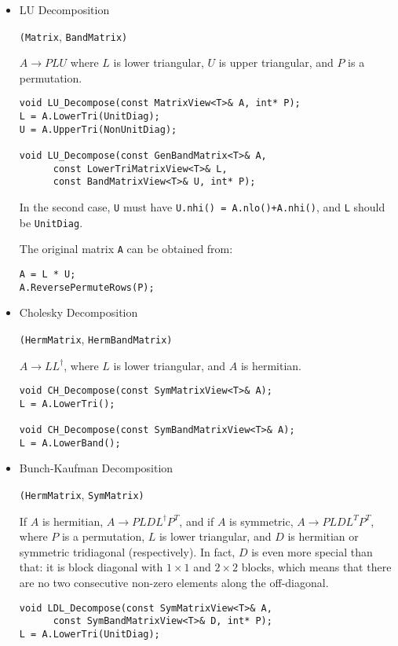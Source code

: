\documentclass[twoside,letterpaper,11pt]{article}
\renewcommand{\tt}[1]{{\texttt {#1}}}
\begin{document}
\begin{itemize}

\item LU Decomposition 

\tt{(Matrix}, \tt{BandMatrix)}

$A \rightarrow P L U$ where $L$ is lower triangular, 
$U$ is upper triangular, and $P$ is a permutation.

\begin{verbatim}
void LU_Decompose(const MatrixView<T>& A, int* P);
L = A.LowerTri(UnitDiag);
U = A.UpperTri(NonUnitDiag);

void LU_Decompose(const GenBandMatrix<T>& A, 
      const LowerTriMatrixView<T>& L, 
      const BandMatrixView<T>& U, int* P);
\end{verbatim}
In the second case, \tt{U} must have \tt{U.nhi() = A.nlo()+A.nhi()},
and \tt{L} should be \tt{UnitDiag}.

The original matrix \tt{A} can be obtained from:
\begin{verbatim}
A = L * U;
A.ReversePermuteRows(P);
\end{verbatim}

\item Cholesky Decomposition 

\tt{(HermMatrix}, \tt{HermBandMatrix)}

$A \rightarrow L L^\dagger$, where $L$ is lower triangular,
and $A$ is hermitian.

\begin{verbatim}
void CH_Decompose(const SymMatrixView<T>& A);
L = A.LowerTri();

void CH_Decompose(const SymBandMatrixView<T>& A);
L = A.LowerBand();
\end{verbatim}

\item Bunch-Kaufman Decomposition 

\tt{(HermMatrix}, \tt{SymMatrix)}

If $A$ is hermitian, $A \rightarrow P L D L^\dagger P^T$,
and if $A$ is symmetric, $A \rightarrow P L D L^T P^T$, where $P$ is a permutation,
$L$ is lower triangular, and $D$ is hermitian or symmetric tridiagonal (respectively).  
In fact, $D$ is even more special than that: it is block diagonal with $1 \times 1$
and $2 \times 2$ blocks,
which means that there are no two consecutive
non-zero elements along the off-diagonal.

\begin{verbatim}
void LDL_Decompose(const SymMatrixView<T>& A, 
      const SymBandMatrixView<T>& D, int* P);
L = A.LowerTri(UnitDiag);
\end{verbatim}


\end{itemize}
\end{document}
